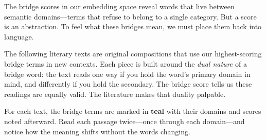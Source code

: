 \documentclass[11pt, a4paper]{article}
\begin{document}
\noindent
The bridge scores in our embedding space reveal words that live between semantic domains---terms that refuse to belong to a single category. But a score is an abstraction. To feel what these bridges mean, we must place them back into language.

\noindent
The following literary texts are original compositions that use our highest-scoring bridge terms in new contexts. Each piece is built around the \emph{dual nature} of a bridge word: the text reads one way if you hold the word's primary domain in mind, and differently if you hold the secondary. The bridge score tells us these readings are equally valid. The literature makes that duality palpable.

\medskip
\noindent
For each text, the bridge terms are marked in \textbf{\color{nile}teal} with their domains and scores noted afterward. Read each passage twice---once through each domain---and notice how the meaning shifts without the words changing.

\bigskip
\end{document}
